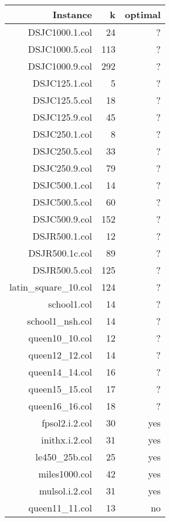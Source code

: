 \documentclass[a4paper]{scrartcl}
\begin{document}
\begin{table}
  \small
    \begin{adjustwidth}{-.5in}{-.5in}  
        \begin{center}
          \begin{tabular}{r | r | r }
                      
            \hline
Instance & k & optimal \\
\hline \hline 
DSJC1000.1.col &  24 & ? \\
DSJC1000.5.col & 113 & ?\\
DSJC1000.9.col & 292 & ?\\
DSJC125.1.col & 5 &  ? \\
DSJC125.5.col & 18 & ? \\
DSJC125.9.col & 45 & ? \\
DSJC250.1.col & 8 & ? \\
DSJC250.5.col & 33 & ? \\
DSJC250.9.col & 79 & ? \\
DSJC500.1.col & 14 & ? \\
DSJC500.5.col & 60 & ? \\
DSJC500.9.col & 152 & ? \\
DSJR500.1.col & 12 & ? \\
DSJR500.1c.col & 89 & ?\\
DSJR500.5.col & 125 & ? \\
latin\_square\_10.col & 124 & ? \\
school1.col & 14 & ? \\
school1\_nsh.col & 14 & ? \\
queen10\_10.col & 12 & ? \\
queen12\_12.col & 14 & ? \\
queen14\_14.col & 16 & ? \\
queen15\_15.col & 17 & ? \\
queen16\_16.col & 18 & ? \\
fpsol2.i.2.col & 30 & yes \\
inithx.i.2.col & 31 & yes \\
le450\_25b.col & 25 & yes \\
miles1000.col & 42 &  yes \\
mulsol.i.2.col & 31 & yes \\
queen11\_11.col & 13 & no \\

\hline
          \end{tabular}
\quad
          \begin{tabular}{r | r  }
                      

\end{tabular}
\end{center}
\end{adjustwidth}
\end{table}
\end{document}
